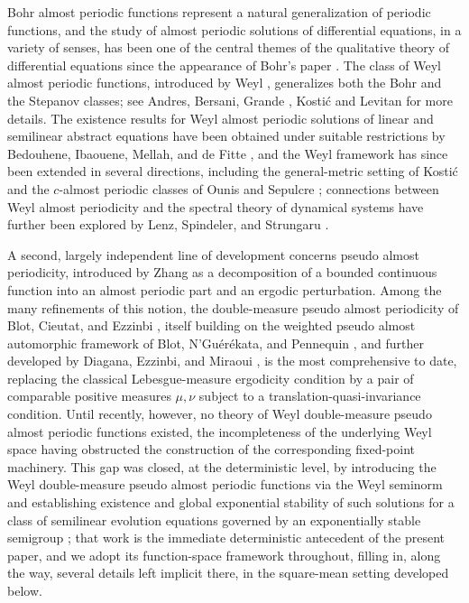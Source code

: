 \documentclass[11pt]{amsart}
\begin{document}
Bohr almost periodic functions represent a natural generalization of periodic functions, and the study of almost periodic solutions of differential equations, in a variety of senses, has been one of the central themes of the qualitative theory of differential equations since the appearance of Bohr's paper \cite{bohr}. The class of Weyl almost periodic functions, introduced  by Weyl \cite{Weyl}, generalizes both the Bohr and the Stepanov classes; see Andres, Bersani, Grande \cite{AndresBersaniGrande}, Kosti\' c \cite{k0} and Levitan \cite{Levitan} for more details. The existence results for Weyl almost periodic solutions of linear and semilinear abstract equations have been obtained under suitable restrictions by Bedouhene, Ibaouene, Mellah, and de Fitte \cite{BedouheneEtAl}, and the Weyl framework has since been extended in several directions, including the general-metric setting of Kosti\'c \cite{k1} and the $c$-almost periodic classes of Ounis and Sepulcre \cite{OunisSepulcre}; connections between Weyl almost periodicity and the spectral theory of dynamical systems have further been explored by Lenz, Spindeler, and Strungaru \cite{LenzSpindelerStrungaru}.

A second, largely independent line of development concerns pseudo almost periodicity, introduced by Zhang \cite{zhang} as a decomposition of a bounded continuous function into an almost periodic part and an ergodic perturbation. Among the many refinements of this notion, the double-measure pseudo almost periodicity of Blot, Cieutat, and Ezzinbi \cite{BlotCieutatEzzinbi,BlotCieutatEzzinbiApplic}, itself building on the weighted pseudo almost automorphic framework of Blot, N'Gu\'er\'ekata, and Pennequin \cite{BlotNguerekataPennequin}, and further developed by Diagana, Ezzinbi, and Miraoui \cite{DiaganaEzzinbiMiraoui}, is the most comprehensive to date, replacing the classical Lebesgue-measure ergodicity condition by a pair of comparable positive measures $\mu,\nu$ subject to a translation-quasi-invariance condition. Until recently, however, no theory of Weyl double-measure pseudo almost periodic functions existed, the incompleteness of the underlying Weyl space having obstructed the construction of the corresponding fixed-point machinery. This gap was closed, at the deterministic level, by introducing the Weyl double-measure pseudo almost periodic functions via the Weyl seminorm and establishing existence and global exponential stability of such solutions for a class of semilinear evolution equations governed by an exponentially stable semigroup \cite{LiWeyl}; that work is the immediate deterministic antecedent of the present paper, and we adopt its function-space framework throughout, filling in, along the way, several details left implicit there, in the square-mean setting developed below.
\end{document}
